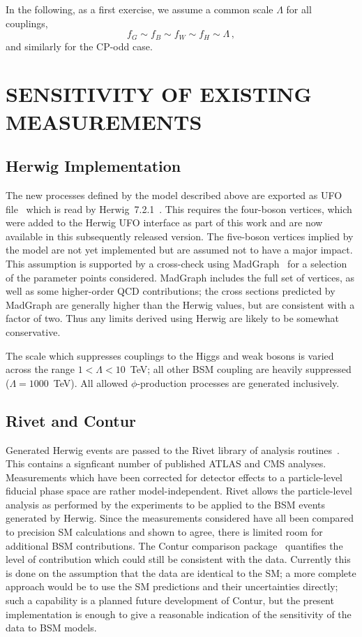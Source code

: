 \documentclass[11pt]{cernrep}
\begin{document}
In the following, as a first exercise, we assume a common scale $\Lambda$ for all couplings,
\begin{equation}
f_G \sim f_B\sim f_W\sim f_H\sim \Lambda \,,
\end{equation}
and similarly for the CP-odd case. 


\section{SENSITIVITY OF EXISTING MEASUREMENTS}

\subsection{Herwig Implementation}

The new processes defined by the model described above are exported as UFO file~\cite{Degrande:2011ua} which is 
read by Herwig~7.2.1~\cite{Bellm:2015jjp,Bahr:2008pv}. This requires the four-boson vertices, 
which were added to the Herwig UFO interface as part of this work 
and are now available in this subsequently released version. The five-boson vertices implied by the model 
are not yet implemented
but are assumed not to have a major impact. 
This assumption is supported by a cross-check using MadGraph~\cite{} for a selection of the parameter points considered. MadGraph
includes the full set of vertices, as well as some higher-order QCD contributions; the cross sections predicted by MadGraph are 
generally higher than the Herwig values, but are consistent with a factor of two. Thus any limits derived using Herwig are likely to
be somewhat conservative.

The scale which suppresses couplings to the 
Higgs and weak bosons is varied across the range $1 < \Lambda < 10$~TeV; all other BSM coupling are heavily 
suppressed ($\Lambda = 1000$~TeV). All
allowed $\phi$-production processes are generated inclusively.

\subsection{Rivet and Contur}

Generated Herwig events are passed to the Rivet library of analysis routines~\cite{Buckley:2010ar}. This contains 
a signficant number of published ATLAS and CMS analyses. Measurements which have been corrected for detector effects
to a particle-level fiducial phase space are rather model-independent. Rivet allows the particle-level analysis as performed
by the experiments to be applied to the BSM events generated by Herwig. Since the measurements considered 
have all been compared to precision SM calculations and shown to agree, there is limited room for additional BSM contributions.
The Contur comparison package~\cite{Butterworth:2016sqg} quantifies the level of contribution which could still be 
consistent with the data. Currently this is done on the assumption that the data are identical to the SM; a more
complete approach would be to use the SM predictions and their uncertainties directly; such a capability is a planned
future development of Contur, but the present implementation is enough to give a reasonable indication of the 
sensitivity of the data to BSM models.
\end{document}
